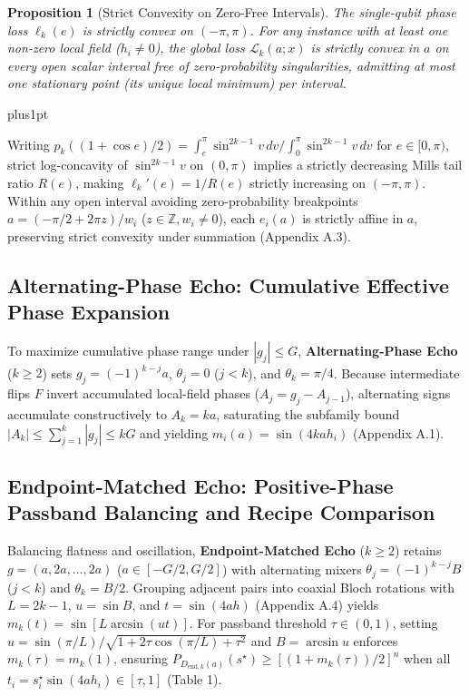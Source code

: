 \documentclass{article}
\makeatletter
\renewenvironment{proof}[1][\proofname]{\par
  \pushQED{\qed}%
  \normalfont \topsep1pt plus1pt\relax
  \trivlist
  \item[\hskip\labelsep
        \itshape
    #1\@addpunct{.}]\ignorespaces
}{%
  \popQED\endtrivlist\@endpefalse
}
\theoremstyle{plain}
\newtheorem{proposition}{Proposition}
\theoremstyle{definition}
\makeatother
\begin{document}
\begin{proposition}[Strict Convexity on Zero-Free Intervals]
\label{prop:4}
The single-qubit phase loss $\ell_k(e)$ is strictly convex on $(-\pi,\pi)$. For any instance with at least one non-zero local field ($h_i\ne 0$), the global loss $\mathcal L_k(a;x)$ is strictly convex in $a$ on every open scalar interval free of zero-probability singularities, admitting at most one stationary point (its unique local minimum) per interval.
\end{proposition}

\begin{proof}[Proof Sketch]
Writing $p_k((1+\cos e)/2)=\int_e^\pi\sin^{2k-1}v\,dv/\int_0^\pi\sin^{2k-1}v\,dv$ for $e\in[0,\pi)$, strict log-concavity of $\sin^{2k-1}v$ on $(0,\pi)$ implies a strictly decreasing Mills tail ratio $R(e)$, making $\ell_k'(e)=1/R(e)$ strictly increasing on $(-\pi,\pi)$. Within any open interval avoiding zero-probability breakpoints $a=(-\pi/2+2\pi z)/w_i$ ($z\in\mathbb Z, w_i\ne 0$), each $e_i(a)$ is strictly affine in $a$, preserving strict convexity under summation (Appendix A.3).
\end{proof}

\subsection{Alternating-Phase Echo: Cumulative Effective Phase Expansion}\label{subsec:3_5}

To maximize cumulative phase range under $|g_j|\le G$, \textbf{Alternating-Phase Echo} ($k\ge 2$) sets $g_j=(-1)^{k-j}a$, $\theta_j=0$ ($j<k$), and $\theta_k=\pi/4$. Because intermediate flips $F$ invert accumulated local-field phases ($A_j=g_j-A_{j-1}$), alternating signs accumulate constructively to $A_k=ka$, saturating the subfamily bound $|A_k|\le\sum_{j=1}^k|g_j|\le kG$ and yielding $m_i(a)=\sin(4kah_i)$ (Appendix A.1).

\subsection{Endpoint-Matched Echo: Positive-Phase Passband Balancing and Recipe Comparison}\label{subsec:3_6}

Balancing flatness and oscillation, \textbf{Endpoint-Matched Echo} ($k\ge 2$) retains $g=(a,2a,\ldots,2a)$ ($a\in[-G/2,G/2]$) with alternating mixers $\theta_j=(-1)^{k-j}B$ ($j<k$) and $\theta_k=B/2$. Grouping adjacent pairs into coaxial Bloch rotations with $L=2k-1$, $u=\sin B$, and $t=\sin(4ah)$ \citep{low2016methodology,vandersypen2005nmr} (Appendix A.4) yields $m_k(t)=\sin[L\arcsin(ut)]$. For passband threshold $\tau\in(0,1)$, setting $u=\sin(\pi/L)/\sqrt{1+2\tau\cos(\pi/L)+\tau^2}$ and $B=\arcsin u$ enforces $m_k(\tau)=m_k(1)$, ensuring $P_{D_{\mathrm{end},k}(a)}(s^\star)\ge[(1+m_k(\tau))/2]^n$ when all $t_i=s_i^\star\sin(4ah_i)\in[\tau,1]$ (Table 1).
\end{document}
